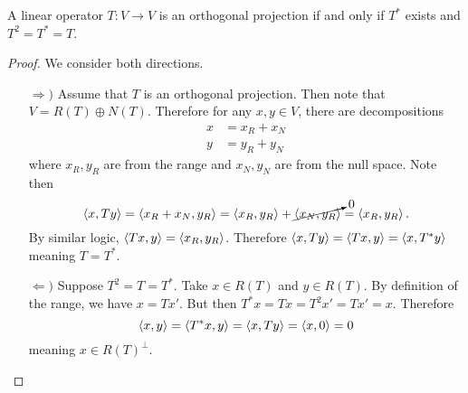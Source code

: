 \documentclass{subfiles}
\begin{document}
\begin{theorem}
    A linear operator $T : V \to V$ is an orthogonal projection if and only if $T^*$ exists and $T^2 = T^* = T$.
\end{theorem}

\begin{proof}
    We consider both directions.
    \begin{enumerate}
        \item[$\Rightarrow)$]
            Assume that $T$ is an orthogonal projection. Then note that $V = R(T) \oplus N(T)$. Therefore for any $x,y \in V$, there are decompositions
            \begin{align*}
                x &= x_R + x_N \\
                y &= y_R + y_N
            \end{align*}
            where $x_R, y_R$ are from the range and $x_N, y_N$ are from the null space. Note then
            \[
                \left\langle x, Ty \right\rangle = \left\langle x_R + x_N, y_R \right\rangle = \left\langle x_R, y_R \right\rangle + \cancelto{0}{\left\langle x_N, y_R \right\rangle} = \left\langle x_R, y_R \right\rangle
            .\]
            By similar logic, $\left\langle Tx, y \right\rangle = \left\langle x_R, y_R \right\rangle$. Therefore $\left\langle x, Ty \right\rangle = \left\langle Tx, y \right\rangle = \left\langle x, T^* y \right\rangle$ meaning $T = T^*$.
        \item[$\Leftarrow)$]
            Suppose $T^2 = T = T^*$. Take $x \in R(T)$ and $y \in R(T)$. By definition of the range, we have $x = Tx'$. But then $T^*x = Tx = T^2 x' = T x' = x$. Therefore
            \[
                \left\langle x,y \right\rangle = \left\langle T^* x, y \right\rangle = \left\langle x, Ty \right\rangle = \left\langle x, 0 \right\rangle = 0
            \]
            meaning $x \in R(T)^\perp$.
    \end{enumerate}
\end{proof}
\end{document}
